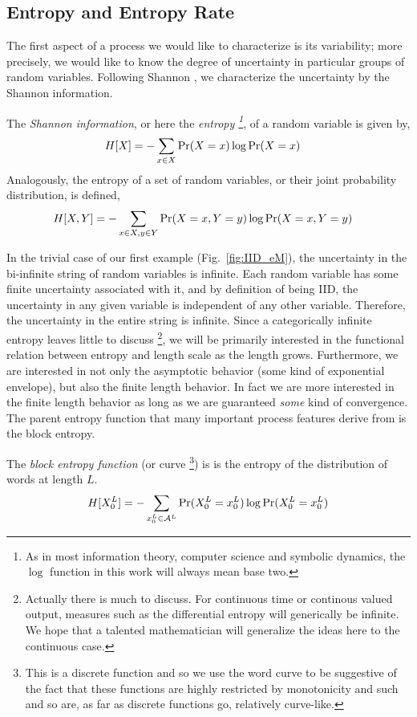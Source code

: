 \subsection{Entropy and Entropy Rate}
The first aspect of a process we would like to characterize is its variability; more precisely, we would like to know the degree of uncertainty in particular groups of random variables. Following Shannon , we characterize the uncertainty by the Shannon information.
\begin{Def}
The \emph{Shannon information}, or here the \emph{entropy \footnote{As in most information theory, computer science and symbolic dynamics, the $\log$ function in this work will always mean base two.}}, of a random variable is given by,
\begin{align*}
H[X] &= -\sum_{x \in X}{\Pr(X=x) \log{\Pr(X=x)}}
\end{align*}
Analogously, the entropy of a set of random variables, or their joint probability distribution, is defined, 
\begin{align*}
H[X, Y] &= -\sum_{x \in X, y \in Y}{\Pr(X=x, Y=y) \log{\Pr(X=x, Y=y)}}
\end{align*}
\end{Def}
In the trivial case of our first example (Fig.~\ref{fig:IID_eM}), the uncertainty in the bi-infinite string of random variables is infinite. Each random variable has some finite uncertainty associated with it, and by definition of being IID, the uncertainty in any given variable is independent of any other variable. Therefore, the uncertainty in the entire string is infinite. Since a categorically infinite entropy leaves little to discuss \footnote{Actually there is much to discuss. For continuous time or continous valued output, measures such as the differential entropy will generically be infinite. We hope that a talented mathematician will generalize the ideas here to the continuous case.}, we will be primarily interested in the functional relation between entropy and length scale as the length grows. Furthermore, we are interested in not only the asymptotic behavior (some kind of exponential envelope), but also the finite length behavior. In fact we are more interested in the finite length behavior as long as we are guaranteed \emph{some} kind of convergence. The parent entropy function that many important process features derive from is the block entropy.
\begin{Def}
The \emph{block entropy function} (or curve \footnote{This is a discrete function and so we use the word curve to be suggestive of the fact that these functions are highly restricted by monotonicity and such and so are, as far as discrete functions go, relatively curve-like.}) is is the entropy of the distribution of words at length $L$.
\begin{align*}
H[{X}_0^L] = -\sum_{{x}_0^L \in \mathcal{A}^L}\Pr({X}_0^L={x}_0^L) \log {\Pr( {X} _0^L= {x} _0^L)}
\end{align*}
\end{Def}
